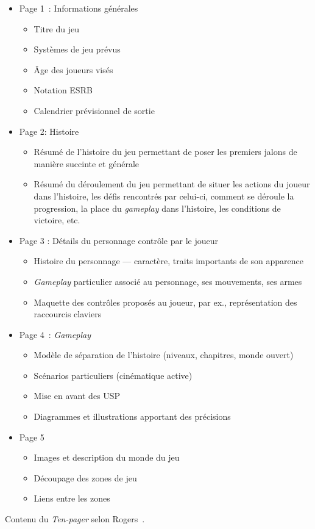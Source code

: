 \begin{table}
\footnotesize
\begin{framed}
\begin{itemize}
    \item Page 1~: Informations générales
    \begin{itemize}
        \item Titre du jeu
        \item Systèmes de jeu prévus
        \item \^Age des joueurs visés
        \item Notation ESRB
        \item Calendrier prévisionnel de sortie
    \end{itemize}
    \item Page 2: Histoire
    \begin{itemize}
        \item  Résumé de l'histoire du jeu permettant de poser les premiers jalons de manière succinte et générale
        \item Résumé du déroulement du jeu  permettant de situer les actions du joueur dans l'histoire, les d\'efis rencontrés par celui-ci, comment se déroule la progression, la place du \emph{gameplay} dans l'histoire, les conditions de victoire, etc.
    \end{itemize}
    \item Page 3 : Détails du personnage contr\^ole par le joueur
    \begin{itemize}
        \item Histoire du personnage --- caractère, traits importants de son apparence
        \item \emph{Gameplay} particulier associé au personnage, ses mouvements, ses armes
        \item Maquette des contrôles proposés au joueur, par ex., représentation des raccourcis claviers
    \end{itemize}
    \item Page 4~: \emph{Gameplay}
    \begin{itemize}
        \item Modèle de séparation de l'histoire (niveaux, chapitres, monde ouvert)
        \item Scénarios particuliers (cinématique active)
        \item Mise en avant des USP
        \item Diagrammes et illustrations apportant des précisions
    \end{itemize}
    \item Page 5
    \begin{itemize}
        \item Images et description du monde du jeu
        \item Découpage des zones de jeu
        \item Liens entre les zones
    \end{itemize}

\end{itemize}
\end{framed}
\caption{Contenu du \emph{Ten-pager} selon Rogers~\cite{LevelUpRogers2014}.}
\end{table}

